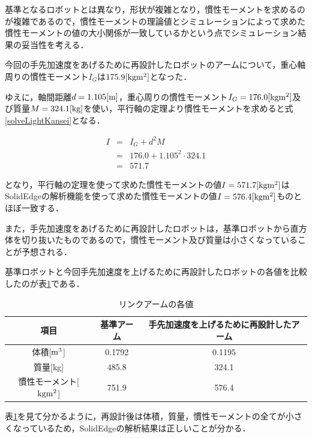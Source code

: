基準となるロボットとは異なり，形状が複雑となり，慣性モーメントを求めるのが複雑であるので，慣性モーメントの理論値とシミュレーションによって求めた慣性モーメントの値の大小関係が一致しているかという点でシミュレーション結果の妥当性を考える．

今回の手先加速度をあげるために再設計したロボットのアームについて，重心軸周りの慣性モーメント\(I_G\)は\(175.9[\rm kgm^2]\)となった．

ゆえに，軸間距離\(d=1.105[\rm m]\)，重心周りの慣性モーメント\(I_G=176.0[\rm kgm^2]\)及び質量\(M=324.1[\rm kg]\)を使い，平行軸の定理より慣性モーメントを求めると式\ref{solveLightKansei}となる．

\begin{eqnarray}
  I &=& I_G+d^2M \nonumber \\
    &=& 176.0 + 1.105^{2} \cdot 324.1 \nonumber \\
    &=& 571.7
  \label{solveLightKansei}
\end{eqnarray}

となり，平行軸の定理を使って求めた慣性モーメントの値\(I=571.7[\rm kgm^2]\)はSolidEdgeの解析機能を使って求めた慣性モーメントの値\(I=576.4[\rm kgm^2]\)ものとほぼ一致する．

また，手先加速度をあげるために再設計したロボットは，基準ロボットから直方体を切り抜いたものであるので，慣性モーメント及び質量は小さくなっていることが予想される．

基準ロボットと今回手先加速度を上げるために再設計したロボットの各値を比較したのが表\ref{compare-basic-light-mass}である．

\begin{table}[htb]
\caption[]{リンクアームの各値}
  \begin{center}
    \begin{tabular}{|c|c|c|} \hline
      項目 & 基準アーム & 手先加速度を上げるために再設計したアーム \\ \hline \hline
      体積[$\rm m^3$] & 0.1792 & 0.1195 \\ \hline
      質量[kg] & 485.8 & 324.1 \\ \hline
      慣性モーメント[$\rm kg m^2$] & 751.9 & 576.4 \\ \hline
    \end{tabular}
    \label{compare-basic-light-mass}
  \end{center}
\end{table}

表\ref{compare-basic-light-mass}を見て分かるように，再設計後は体積，質量，慣性モーメントの全てが小さくなっているため，SolidEdgeの解析結果は正しいことが分かる．

